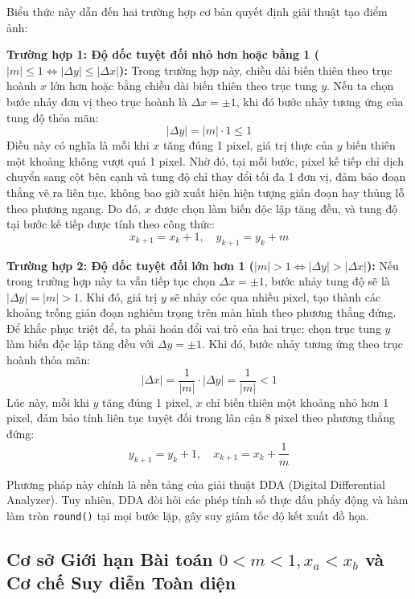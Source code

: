Biểu thức này dẫn đến hai trường hợp cơ bản quyết định giải thuật tạo điểm ảnh:

\textbf{Trường hợp 1: Độ dốc tuyệt đối nhỏ hơn hoặc bằng 1 ($|m| \le 1 \iff |\Delta y| \le |\Delta x|$):}
Trong trường hợp này, chiều dài biến thiên theo trục hoành $x$ lớn hơn hoặc bằng chiều dài biến thiên theo trục tung $y$. Nếu ta chọn bước nhảy đơn vị theo trục hoành là $\Delta x = \pm 1$, khi đó bước nhảy tương ứng của tung độ thỏa mãn:
\begin{equation}
|\Delta y| = |m| \cdot 1 \le 1
\end{equation}
Điều này có nghĩa là mỗi khi $x$ tăng đúng 1 pixel, giá trị thực của $y$ biến thiên một khoảng không vượt quá 1 pixel. Nhờ đó, tại mỗi bước, pixel kế tiếp chỉ dịch chuyển sang cột bên cạnh và tung độ chỉ thay đổi tối đa 1 đơn vị, đảm bảo đoạn thẳng vẽ ra liên tục, không bao giờ xuất hiện hiện tượng gián đoạn hay thủng lỗ theo phương ngang. Do đó, $x$ được chọn làm biến độc lập tăng đều, và tung độ tại bước kế tiếp được tính theo công thức:
\begin{equation}
x_{k+1} = x_k + 1, \quad y_{k+1} = y_k + m
\end{equation}

\textbf{Trường hợp 2: Độ dốc tuyệt đối lớn hơn 1 ($|m| > 1 \iff |\Delta y| > |\Delta x|$):}
Nếu trong trường hợp này ta vẫn tiếp tục chọn $\Delta x = \pm 1$, bước nhảy tung độ sẽ là $|\Delta y| = |m| > 1$. Khi đó, giá trị $y$ sẽ nhảy cóc qua nhiều pixel, tạo thành các khoảng trống gián đoạn nghiêm trọng trên màn hình theo phương thẳng đứng. Để khắc phục triệt để, ta phải hoán đổi vai trò của hai trục: chọn trục tung $y$ làm biến độc lập tăng đều với $\Delta y = \pm 1$. Khi đó, bước nhảy tương ứng theo trục hoành thỏa mãn:
\begin{equation}
|\Delta x| = \frac{1}{|m|} \cdot |\Delta y| = \frac{1}{|m|} < 1
\end{equation}
Lúc này, mỗi khi $y$ tăng đúng 1 pixel, $x$ chỉ biến thiên một khoảng nhỏ hơn 1 pixel, đảm bảo tính liên tục tuyệt đối trong lân cận 8 pixel theo phương thẳng đứng:
\begin{equation}
y_{k+1} = y_k + 1, \quad x_{k+1} = x_k + \frac{1}{m}
\end{equation}

Phương pháp này chính là nền tảng của giải thuật DDA (Digital Differential Analyzer). Tuy nhiên, DDA đòi hỏi các phép tính số thực dấu phẩy động và hàm làm tròn \texttt{round()} tại mọi bước lặp, gây suy giảm tốc độ kết xuất đồ họa.

\subsection{Cơ sở Giới hạn Bài toán \texorpdfstring{$0 < m < 1, x_a < x_b$}{0 < m < 1, xa < xb} và Cơ chế Suy diễn Toàn diện}

